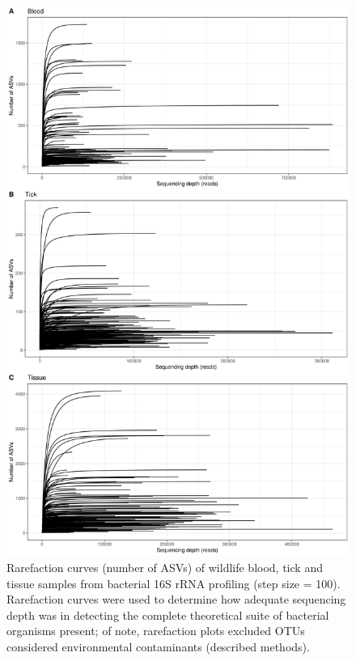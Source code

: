 \documentclass[a4paper, nobind]{templates/ociamthesis}
\begin{document}
\begin{figure}
\includegraphics[width=0.85\linewidth]{figures/ms-figs-appendix/FigA-3.2} \caption[Rarefaction curves of bacterial 16S rRNA sequencing from wildlife samples.]{Rarefaction curves (number of ASVs) of wildlife blood, tick and tissue samples from bacterial 16S rRNA profiling (step size = 100). Rarefaction curves were used to determine how adequate sequencing depth was in detecting the complete theoretical suite of bacterial organisms present; of note, rarefaction plots excluded OTUs considered environmental contaminants (described methods).}\label{fig:FA32}
\end{figure}

\newpage
\end{document}
